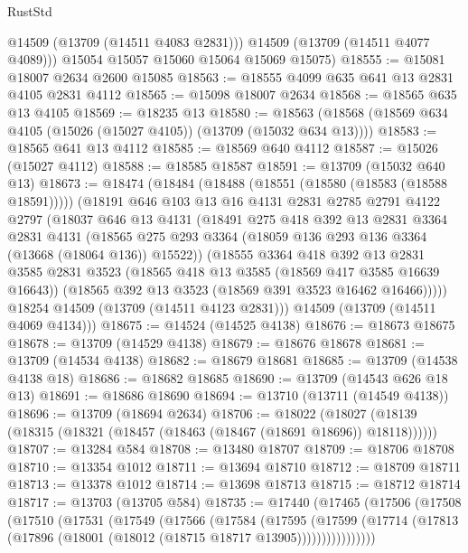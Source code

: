 \begin{lexlean}{RustStd}
\begin{coremodule}
          @14509
          (@13709 (@14511 @4083 @2831)))
        @14509
        (@13709 (@14511 @4077 @4089)))
      @15054
      @15057
      @15060
      @15064
      @15069
      @15075)
@18555 := @15081 @18007 @2634 @2600 @15085
@18563 := @18555 @4099 @635 @641 @13 @2831 @4105 @2831 @4112
@18565 := @15098 @18007 @2634
@18568 := @18565 @635 @13 @4105
@18569 := @18235 @13
@18580 := @18563 (@18568 (@18569 @634 @4105 (@15026 (@15027 @4105)) (@13709 (@15032 @634 @13))))
@18583 := @18565 @641 @13 @4112
@18585 := @18569 @640 @4112
@18587 := @15026 (@15027 @4112)
@18588 := @18585 @18587
@18591 := @13709 (@15032 @640 @13)
@18673 := @18474
    (@18484
      (@18488 (@18551 (@18580 (@18583 (@18588 @18591)))))
      (@18191
        @646
        @103
        @13
        @16
        @4131
        @2831
        @2785
        @2791
        @4122
        @2797
        (@18037
          @646
          @13
          @4131
          (@18491
            @275
            @418
            @392
            @13
            @2831
            @3364
            @2831
            @4131
            (@18565 @275 @293 @3364 (@18059 @136 @293 @136 @3364 (@13668 (@18064 @136)) @15522))
            (@18555
              @3364
              @418
              @392
              @13
              @2831
              @3585
              @2831
              @3523
              (@18565 @418 @13 @3585 (@18569 @417 @3585 @16639 @16643))
              (@18565 @392 @13 @3523 (@18569 @391 @3523 @16462 @16466)))))
        @18254
        @14509
        (@13709 (@14511 @4123 @2831)))
      @14509
      (@13709 (@14511 @4069 @4134)))
@18675 := @14524 (@14525 @4138)
@18676 := @18673 @18675
@18678 := @13709 (@14529 @4138)
@18679 := @18676 @18678
@18681 := @13709 (@14534 @4138)
@18682 := @18679 @18681
@18685 := @13709 (@14538 @4138 @18)
@18686 := @18682 @18685
@18690 := @13709 (@14543 @626 @18 @13)
@18691 := @18686 @18690
@18694 := @13710 (@13711 (@14549 @4138))
@18696 := @13709 (@18694 @2634)
@18706 := @18022
    (@18027 (@18139 (@18315 (@18321 (@18457 (@18463 (@18467 (@18691 @18696)) @18118))))))
@18707 := @13284 @584
@18708 := @13480 @18707
@18709 := @18706 @18708
@18710 := @13354 @1012
@18711 := @13694 @18710
@18712 := @18709 @18711
@18713 := @13378 @1012
@18714 := @13698 @18713
@18715 := @18712 @18714
@18717 := @13703 (@13705 @584)
@18735 := @17440
    (@17465
      (@17506
        (@17508
          (@17510
            (@17531
              (@17549
                (@17566
                  (@17584
                    (@17595
                      (@17599
                        (@17714
                          (@17813 (@17896 (@18001 (@18012 (@18715 @18717 @13905))))))))))))))))

\end{coremodule}
\end{lexlean}

